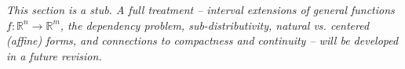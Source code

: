 \begin{remark*}[Status]
\textit{This section is a stub. A full treatment -- interval extensions of general
functions $f:\mathbb{R}^n\to\mathbb{R}^m$, the dependency problem, sub-distributivity,
natural vs. centered (affine) forms, and connections to compactness and continuity --
will be developed in a future revision.}
\end{remark*}
